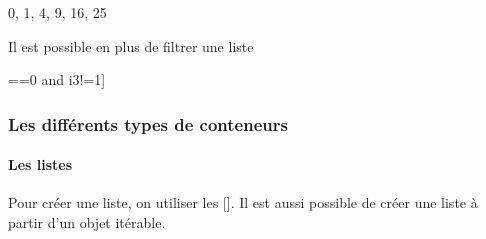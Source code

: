 \documentclass[letterpaper,10pt,english]{sphinxhowto}
\begin{document}
\begin{sphinxVerbatim}[commandchars=\\\{\}]
\PYGZob{}0, 1, 4, 9, 16, 25\PYGZcb{}
\end{sphinxVerbatim}

\sphinxAtStartPar
Il est possible en plus de filtrer une liste

\begin{sphinxVerbatim}[commandchars=\\\{\}]
\PYG{p}{[}      ==0 and i\PYGZpc{}3!=1]
\end{sphinxVerbatim}

\begin{sphinxVerbatim}[commandchars=\\\{\}]
[0, 2, 6, 8, 12, 14, 18]
\end{sphinxVerbatim}


\subsubsection{Les différents types de conteneurs}
\label{\detokenize{cours3_conteneur_cours:les-differents-types-de-conteneurs}}

\paragraph{Les listes}
\label{\detokenize{cours3_conteneur_cours:les-listes}}
\sphinxAtStartPar
Pour créer une liste, on utiliser les {[}{]}. Il est aussi possible de créer une liste à partir d’un objet itérable.

\begin{sphinxVerbatim}[commandchars=\\\{\}]
  \PYG{p}{[} \PYG{p}{]}
  
\end{sphinxVerbatim}

\begin{sphinxVerbatim}
\end{sphinxVerbatim}
\end{document}
